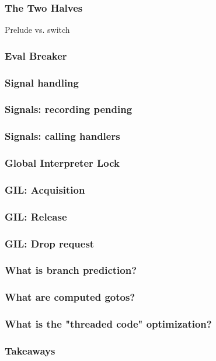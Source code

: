 \begin{frame}
\frametitle{The Two Halves}
Prelude vs. switch
\end{frame}

\begin{frame}
\frametitle{Eval Breaker}
\end{frame}

\begin{frame}
\frametitle{Signal handling}
\end{frame}

\begin{frame}
\frametitle{Signals: recording pending}
\end{frame}

\begin{frame}
\frametitle{Signals: calling handlers}
\end{frame}

\begin{frame}
\frametitle{Global Interpreter Lock}
\end{frame}

\begin{frame}
\frametitle{GIL: Acquisition}
\end{frame}

\begin{frame}
\frametitle{GIL: Release}
\end{frame}

\begin{frame}
\frametitle{GIL: Drop request}
\end{frame}

\begin{frame}
\frametitle{What is branch prediction?}
\end{frame}

\begin{frame}
\frametitle{What are computed gotos?}
\end{frame}

\begin{frame}
\frametitle{What is the "threaded code" optimization?}
\end{frame}

\begin{frame}
\frametitle{Takeaways}
\end{frame}


